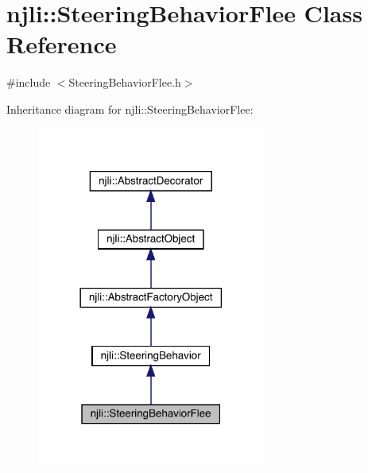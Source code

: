 \hypertarget{classnjli_1_1_steering_behavior_flee}{}\section{njli\+:\+:Steering\+Behavior\+Flee Class Reference}
\label{classnjli_1_1_steering_behavior_flee}


{\ttfamily \#include $<$Steering\+Behavior\+Flee.\+h$>$}



Inheritance diagram for njli\+:\+:Steering\+Behavior\+Flee\+:\nopagebreak
\begin{figure}[H]
\begin{center}
\leavevmode
\includegraphics[width=213pt]{classnjli_1_1_steering_behavior_flee__inherit__graph}
\end{center}
\end{figure}


